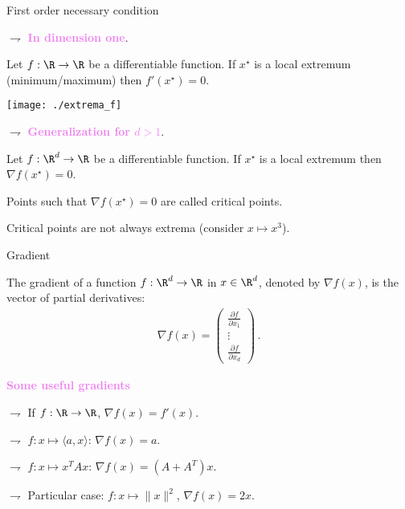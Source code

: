 \documentclass[xcolor={usenames,dvipsnames}]{beamer}
\begin{document}
\begin{frame}{First order necessary condition}
	
$\rightharpoondown$ {\bf \textcolor{violet}{In dimension one}}.
		
Let $f : \R \to \R$ be a differentiable function. If $x^{\star}$ is a local extremum (minimum/maximum) then $f'(x^{\star}) = 0$.
		
\begin{center}
\texttt{[image: ./extrema\_f]}
\end{center}
	
$\rightharpoondown$ {\bf \textcolor{violet}{Generalization for $d>1$}}. 
		
Let $f: \R^d \to \R$ be a differentiable function. If $x^{\star}$ is a local extremum then $\nabla f(x^{\star}) = 0$.
		
\vspace{.6cm}

Points such that $\nabla f(x^{\star}) = 0$ are called \alert{critical points}. 
	
\vspace{.2cm}

\alert{Critical points are not always extrema} (consider $x \mapsto x^3$).	
\end{frame}

\begin{frame}{Gradient}
	
The gradient of a function $f: \R^d \to \R$ in $x\in\R^d$, denoted by $\nabla f (x)$, is \alert{the vector of partial derivatives}:
\begin{align*}
\nabla f(x) =  \begin{pmatrix}
			\frac{\partial f}{\partial x_1} \\
			\vdots \\
			\frac{\partial f}{\partial x_d}
		 \end{pmatrix}\,.
\end{align*}

\textbf{\textcolor{violet}{Some useful gradients}}

$\rightharpoondown$ If $f: \R \to \R$, $\nabla f(x) = f'(x)$.

$\rightharpoondown$ $f:x \mapsto \langle a,x\rangle$: $\nabla f(x) = a$.
	
$\rightharpoondown$ $f:x \mapsto x^T A x$: $\nabla f(x) = (A + A^T) x$.
	
$\rightharpoondown$ Particular case: $f: x \mapsto \|x\|^2$, $\nabla f(x) = 2x$.

\end{frame}
\end{document}
